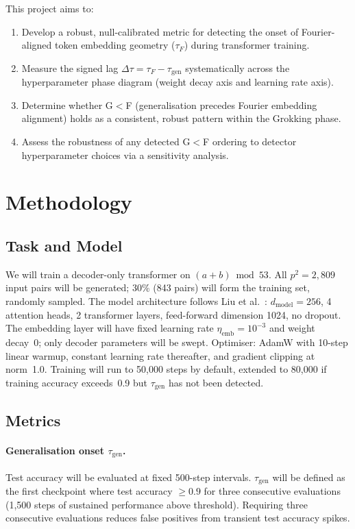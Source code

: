 \documentclass[12pt,openany,a4paper]{book}
\newcommand{\taug}{\tau_{\mathrm{gen}}}
\newcommand{\tauf}{\tau_{F}}
\newcommand{\Dtau}{\Delta\tau}
\begin{document}
This project aims to:
\begin{enumerate}
  \item Develop a robust, null-calibrated metric for detecting the
    onset of Fourier-aligned token embedding geometry ($\tauf$) during
    transformer training.
  \item Measure the signed lag $\Dtau = \tauf - \taug$ systematically
    across the hyperparameter phase diagram (weight decay axis and
    learning rate axis).
  \item Determine whether G$<$F (generalisation precedes Fourier
    embedding alignment) holds as a consistent, robust pattern within
    the Grokking phase.
  \item Assess the robustness of any detected G$<$F ordering to
    detector hyperparameter choices via a sensitivity analysis.
\end{enumerate}

\section{Methodology}

\subsection{Task and Model}

We will train a decoder-only transformer \cite{vaswani2017attention}
on $(a+b)\bmod 53$.
All $p^2 = 2{,}809$ input pairs will be generated; 30\% (843 pairs)
will form the training set, randomly sampled.
The model architecture follows Liu et al.\ \cite{liu2022towards}:
$d_{\mathrm{model}}=256$, 4 attention heads, 2 transformer layers,
feed-forward dimension 1024, no dropout.
The embedding layer will have fixed learning rate $\eta_{\mathrm{emb}}
= 10^{-3}$ and weight decay~0; only decoder parameters will be swept.
Optimiser: AdamW with 10-step linear warmup, constant learning rate
thereafter, and gradient clipping at norm~1.0.
Training will run to 50{,}000 steps by default, extended to 80{,}000
if training accuracy exceeds~0.9 but $\taug$ has not been detected.

\subsection{Metrics}

\paragraph{Generalisation onset $\taug$.}
Test accuracy will be evaluated at fixed 500-step intervals.
$\taug$ will be defined as the first checkpoint where test accuracy
$\geq 0.9$ for three consecutive evaluations (1{,}500 steps of
sustained performance above threshold).
Requiring three consecutive evaluations reduces false positives from
transient test accuracy spikes.
\end{document}

